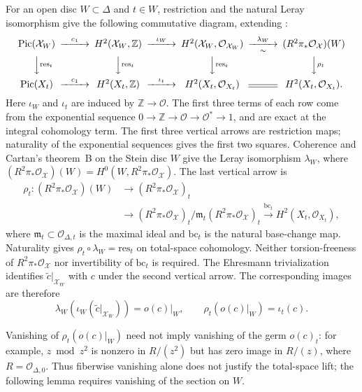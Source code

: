\documentclass[11pt]{amsart}
\numberwithin{equation}{section}
\theoremstyle{plain}
\theoremstyle{definition}
\newcommand{\Z}{\mathbb Z}
\newcommand{\cO}{\mathcal O}
\newcommand{\cX}{\mathcal X}
\newcommand{\Pic}{\operatorname{Pic}}
\begin{document}
For an open disc $W\subset\Delta$ and $t\in W$, restriction and the natural Leray
isomorphism give the following commutative diagram, extending
\cite[equation~(4.6)]{RT21}:
\begin{equation}\label{eq:revised-exponential-restriction}
\begin{CD}
 \Pic(\cX_W) @>{c_1}>> H^2(\cX_W,\Z)
 @>{\iota_W}>> H^2(\cX_W,\cO_{\cX_W})
 @>{\lambda_W}>{\sim}> (R^2\pi_*\cO_{\cX})(W)\\
 @VV{\mathrm{res}_t}V @VV{\mathrm{res}_t}V @VV{\mathrm{res}_t}V
 @VV{\rho_t}V\\
 \Pic(X_t) @>{c_1}>> H^2(X_t,\Z)
 @>{\iota_t}>> H^2(X_t,\cO_{X_t}) @= H^2(X_t,\cO_{X_t}).
\end{CD}
\end{equation}
Here $\iota_W$ and $\iota_t$ are induced by $\Z\to\cO$.
The first three terms of each row come from the exponential sequence
$0\to\Z\to\cO\to\cO^*\to1$, and are exact at the integral
cohomology term.  The first three vertical arrows are restriction maps;
naturality of the exponential sequences gives the first two squares.
Coherence and Cartan's theorem~B on the Stein disc $W$ give the
Leray isomorphism $\lambda_W$, where
$(R^2\pi_*\cO_{\cX})(W)=H^0(W,R^2\pi_*\cO_{\cX})$.
The last vertical arrow is
\[
 \begin{aligned}
 \rho_t:(R^2\pi_*\cO_{\cX})(W)
 &\longrightarrow (R^2\pi_*\cO_{\cX})_t\\
 &\longrightarrow
 (R^2\pi_*\cO_{\cX})_t/\mathfrak m_t(R^2\pi_*\cO_{\cX})_t
 \xrightarrow{\mathrm{bc}_t}H^2(X_t,\cO_{X_t}),
 \end{aligned}
\]
where $\mathfrak m_t\subset\cO_{\Delta,t}$ is the maximal ideal and
$\mathrm{bc}_t$ is the natural base-change map.  Naturality gives
$\rho_t\circ\lambda_W=\mathrm{res}_t$ on total-space cohomology.
Neither torsion-freeness of
$R^2\pi_*\cO_{\cX}$ nor invertibility of $\mathrm{bc}_t$ is required.
The Ehresmann trivialization identifies $\widetilde c|_{\cX_W}$ with $c$ under the
second vertical arrow.  The corresponding images are therefore
\[
 \lambda_W\!\left(\iota_W(\widetilde c|_{\cX_W})\right)=o(c)|_W,
 \qquad
 \rho_t(o(c)|_W)=\iota_t(c).
\]

Vanishing of $\rho_t(o(c)|_W)$ need not imply vanishing of the germ
$o(c)_t$: for example, $z\bmod z^2$ is nonzero in $R/(z^2)$ but
has zero image in $R/(z)$, where $R=\cO_{\Delta,0}$.
Thus fiberwise vanishing alone does not justify the total-space lift;
the following lemma requires vanishing of the section on $W$.
\end{document}

